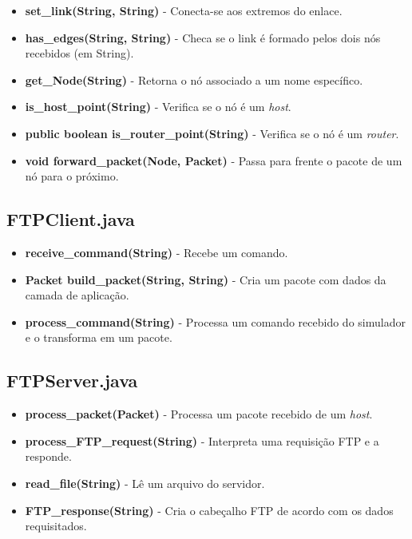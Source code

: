 \documentclass[11pt]{article}
\begin{document}
\begin{itemize}
	\item \textbf{set\_link(String, String)} - Conecta-se aos extremos do enlace.
	\item \textbf{has\_edges(String, String)} - Checa se o link é formado pelos dois nós recebidos (em String).
	\item \textbf{get\_Node(String)} - Retorna o nó associado a um nome específico.
	\item \textbf{is\_host\_point(String)} - Verifica se o nó é um \textit{host}.
	\item \textbf{public boolean is\_router\_point(String)} - Verifica se o nó é um \textit{router}.
	\item \textbf{void forward\_packet(Node, Packet)} - Passa para frente o pacote de um nó para o próximo.
\end{itemize}

\subsection{FTPClient.java}

\begin{itemize}
	\item \textbf{receive\_command(String)} - Recebe um comando.
	\item \textbf{Packet build\_packet(String, String)} - Cria um pacote com dados da camada de aplicação.
	\item \textbf{process\_command(String)} - Processa um comando recebido do simulador e o transforma em um pacote.
\end{itemize}

\subsection{FTPServer.java}

\begin{itemize}
	\item \textbf{process\_packet(Packet)} - Processa um pacote recebido de um \textit{host}.
	\item \textbf{process\_FTP\_request(String)} - Interpreta uma requisição FTP e a responde.
	\item \textbf{read\_file(String)} - Lê um arquivo do servidor.
	\item \textbf{FTP\_response(String)} - Cria o cabeçalho FTP de acordo com os dados requisitados.
\end{itemize}
\end{document}
